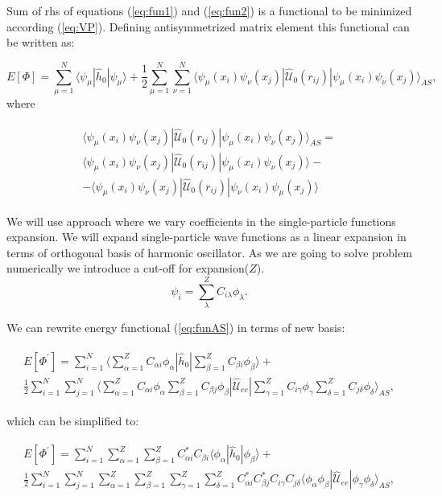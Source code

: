 \documentclass[10pt]{article}
\newcommand*{\hatU}{\hat{\mathcal{U}}}
\begin{document}
Sum of rhs of equations (\ref{eq:fun1}) and (\ref{eq:fun2}) is a functional to be minimized according (\ref{eq:VP}).
Defining antisymmetrized matrix element this functional can be written as:

\begin{equation}
E[\Phi] = \sum_{\mu=1}^N \langle \psi_{\mu} | \hat{h}_0 | \psi_{\mu} \rangle + \frac{1}{2}\sum_{\mu=1}^N\sum_{\nu=1}^N\langle \psi_{\mu}(x_i)\psi_{\nu}(x_j)|\hatU_{0}(r_{ij})|\psi_{\mu}(x_i)\psi_{\nu}(x_j)\rangle_{AS},
\label{eq:funAS}
\end{equation}
where

\begin{align}
\begin{split}
\langle \psi_{\mu}(x_i)\psi_{\nu}(x_j)|\hatU_{0}(r_{ij})|\psi_{\mu}(x_i)\psi_{\nu}(x_j)\rangle_{AS} = \\
\langle \psi_{\mu}(x_i)\psi_{\nu}(x_j)|\hatU_{0}(r_{ij})|\psi_{\mu}(x_i)\psi_{\nu}(x_j)\rangle - \\
- \langle \psi_{\mu}(x_i)\psi_{\nu}(x_j)|\hatU_{0}(r_{ij})|\psi_{\nu}(x_i)\psi_{\mu}(x_j)\rangle
\end{split}
\end{align}


We will use approach where we vary coefficients in the single-particle functions expansion.  We will expand single-particle wave functions as a linear expansion in terms
of orthogonal basis of harmonic oscillator. As we are going to solve problem numerically we introduce a cut-off for expansion($Z$).
\[
\psi_i  = \sum_{\lambda}^Z C_{i\lambda}\phi_{\lambda}. \label{eq:newbasis}
\]

We can rewrite energy functional (\ref{eq:funAS}) in terms of new basis:

\begin{align}
\begin{split}
E[\Phi^{\prime}] = \sum_{i=1}^N \langle \sum_{\alpha=1}^Z C_{\alpha i}\phi_{\alpha} | \hat{h}_0 | \sum_{\beta=1}^Z C_{\beta i}\phi_{\beta} \rangle + \\
\frac{1}{2}\sum_{i=1}^N\sum_{j=1}^N \langle \sum_{\alpha=1}^Z C_{\alpha i}\phi_{\alpha} \sum_{\beta=1}^Z C_{\beta j}\phi_{\beta} |\hatU_{ee}|
\sum_{\gamma=1}^Z C_{i \gamma}\phi_{\gamma} \sum_{\delta=1}^Z C_{j \delta}\phi_{\delta} \rangle _{AS},
\label{eq:newbasisintro}
\end{split}
\end{align}

which can be simplified to:

\begin{align}
\begin{split}
E[\Phi^{\prime}] = \sum_{i=1}^N \sum_{\alpha=1}^Z \sum_{\beta=1}^Z C_{\alpha i}^*  C_{\beta i} \langle \phi_{\alpha} | \hat{h}_0 | \phi_{\beta} \rangle + \\
\frac{1}{2}\sum_{i=1}^N\sum_{j=1}^N  \sum_{\alpha=1}^Z \sum_{\beta=1}^Z \sum_{\gamma=1}^Z \sum_{\delta=1}^Z C_{\alpha i}^*  C_{\beta j}^* C_{i \gamma} C_{j \delta} \langle \phi_{\alpha} \phi_{\beta} |\hatU_{ee}|
 \phi_{\gamma}  \phi_{\delta} \rangle _{AS},
\label{eq:newbasisgood}
\end{split}
\end{align}
\end{document}
